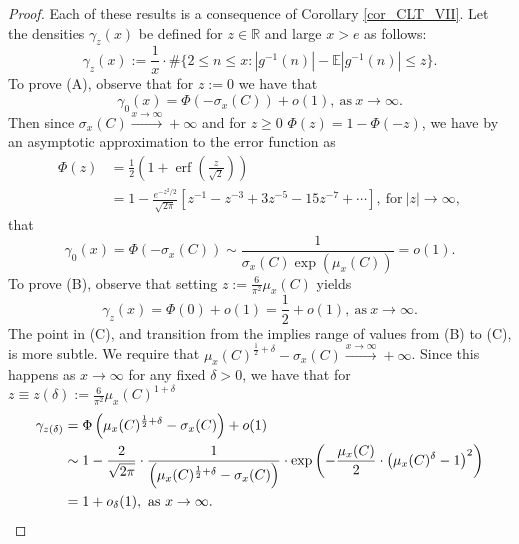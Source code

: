 \documentclass[11pt,reqno,a4letter]{article}
\numberwithin{figure}{section}
\numberwithin{table}{section}
\theoremstyle{plain}
\numberwithin{theorem}{section}
\theoremstyle{definition}
\begin{document}
\begin{proof} 
Each of these results is a consequence of Corollary \ref{cor_CLT_VII}. 
Let the densities $\gamma_z(x)$ be defined for $z \in \mathbb{R}$ and 
large $x > e$ as follows: 
\[
\gamma_z(x) := \frac{1}{x} \cdot \#\{2 \leq n \leq x: |g^{-1}(n)| - \mathbb{E}|g^{-1}(n)| \leq z\}. 
\]
To prove (A), observe that for $z := 0$ we have that 
\[
\gamma_0(x) = \Phi\left(-\sigma_x(C)\right) + o(1), \mathrm{\ as\ } x \rightarrow \infty. 
\]
Then since $\sigma_x(C) \xrightarrow{x \rightarrow \infty} +\infty$ and for $z \geq 0$ 
$\Phi(z) = 1 - \Phi(-z)$, we have by an asymptotic approximation 
to the error function as 
\begin{align*} 
\Phi(z) & = \frac{1}{2}\left(1 + \operatorname{erf}\left(\frac{z}{\sqrt{2}}\right)\right) \\ 
     & = 1 - \frac{e^{-z^2/2}}{\sqrt{2\pi}}\left[ 
     z^{-1} - z^{-3} + 3z^{-5} - 15z^{-7} + \cdots 
     \right], \mathrm{\ for\ } |z| \rightarrow \infty, 
\end{align*} 
that 
\[
\gamma_0(x) = \Phi\left(-\sigma_x(C)\right) \sim \frac{1}{\sigma_x(C) \exp(\mu_x(C))} = o(1). 
\]
To prove (B), observe that setting $z := \frac{6}{\pi^2} \mu_x(C)$ yields 
\[
\gamma_z(x) = \Phi(0) + o(1) = \frac{1}{2} + o(1), \mathrm{\ as\ } x \rightarrow \infty. 
\]
The point in (C), and transition from the implies range of values from (B) to (C), is more subtle. 
We require that $\mu_x(C)^{\frac{1}{2} + \delta} - \sigma_x(C) \xrightarrow{x \rightarrow \infty} +\infty$. 
Since this happens as $x \rightarrow \infty$ for any fixed $\delta > 0$, we have that 
for $z \equiv z(\delta) := \frac{6}{\pi^2} \mu_x(C)^{1 + \delta}$ 
\begin{align*} 
\gamma_{z(\delta)} & = \Phi\left(\mu_x(C)^{\frac{1}{2} + \delta} - \sigma_x(C)\right) + o(1) \\ 
     & \sim 1 - \frac{2}{\sqrt{2\pi}} \cdot \frac{1}{\left(\mu_x(C)^{\frac{1}{2} + \delta} - \sigma_x(C)\right)} \cdot 
     \exp\left(-\frac{\mu_x(C)}{2} \cdot \left(\mu_x(C)^{\delta} - 1\right)^2\right) \\ 
     & = 1 + o_{\delta}(1), \mathrm{\ as\ } x \rightarrow \infty. 
     \qedhere 
\end{align*} 
\end{proof} 
\end{document}
